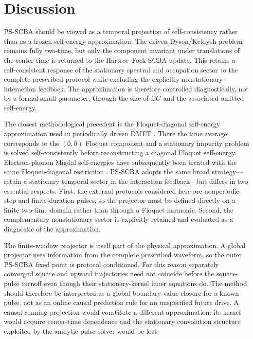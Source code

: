 \documentclass[
 reprint,
 superscriptaddress,
 amsmath,amssymb,
 aps,prb,
 longbibliography,
 floatfix
]{revtex4-2}
\newcommand{\qproj}{\mathcal Q}
\begin{document}
\section{Discussion}
\label{sec:discussion}

PS-SCBA should be viewed as a temporal projection of self-consistency rather than as a frozen-self-energy approximation. The driven Dyson/Keldysh problem remains fully two-time, but only the component invariant under translations of the center time is returned to the Hartree--Fock SCBA update. This retains a self-consistent response of the stationary spectral and occupation sector to the complete prescribed protocol while excluding the explicitly nonstationary interaction feedback. The approximation is therefore controlled diagnostically, not by a formal small parameter, through the size of \(\qproj G\) and the associated omitted self-energy.

The closest methodological precedent is the Floquet-diagonal self-energy approximation used in periodically driven DMFT \cite{SorantinEtAl2018}. There the time average corresponds to the \((0,0)\) Floquet component and a stationary impurity problem is solved self-consistently before reconstructing a diagonal Floquet self-energy. Electron-phonon Migdal self-energies have subsequently been treated with the same Floquet-diagonal restriction \cite{GazzaneoEtAl2022,GazzaneoArrigoni2025}. PS-SCBA adopts the same broad strategy---retain a stationary temporal sector in the interaction feedback---but differs in two essential respects. First, the external protocols considered here are nonperiodic step and finite-duration pulses, so the projector must be defined directly on a finite two-time domain rather than through a Floquet harmonic. Second, the complementary nonstationary sector is explicitly retained and evaluated as a diagnostic of the approximation.

The finite-window projector is itself part of the physical approximation. A global projector uses information from the complete prescribed waveform, so the outer PS-SCBA fixed point is protocol conditioned. For this reason separately converged square and upward trajectories need not coincide before the square-pulse turnoff even though their stationary-kernel inner equations do. The method should therefore be interpreted as a global boundary-value closure for a known pulse, not as an online causal prediction rule for an unspecified future drive. A causal running projection would constitute a different approximation: its kernel would acquire center-time dependence and the stationary convolution structure exploited by the analytic pulse solver would be lost.
\end{document}
